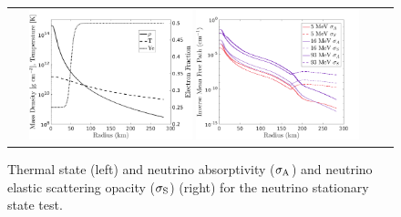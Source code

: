 \begin{figure}[h]
  \centering
  \begin{tabular}{cc}
    \includegraphics[width=0.45\textwidth]{figures/NStatinaryS_EOS}
    \includegraphics[width=0.45\textwidth]{figures/NSS_Opacities}
  \end{tabular}
   \caption{Thermal state (left) and neutrino absorptivity ($\sigma_{{\rm A}}$) and neutrino elastic scattering opacity ($ \sigma_{{\rm S}}$) (right) for the neutrino stationary state test.}
   \label{fig:NeutrinoStationaryTestEOS}
\end{figure}

